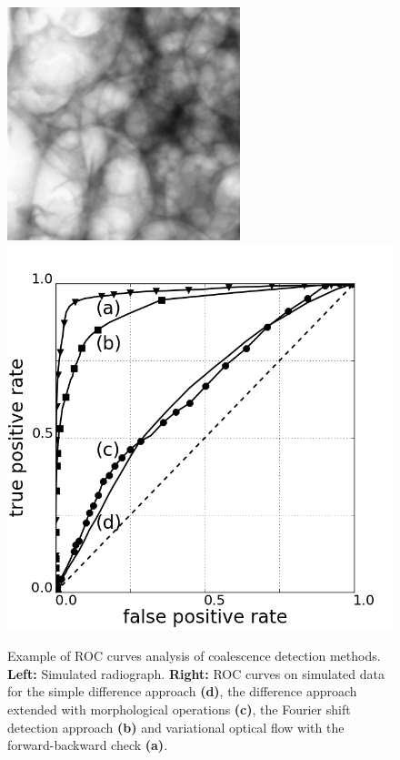 \begin{figure}[ht]
  \centerline{
    \mbox{\includegraphics[scale=0.635]{figures/sim_foam.png}}
    \mbox{\vspace{15pt} \includegraphics[scale=0.26]{figures/image_roc_all_methods_v3.png}}
  }
  \caption[]{Example of ROC curves analysis of coalescence detection methods. \textbf{Left:} Simulated radiograph. \textbf{Right:} ROC curves on simulated data for the simple difference approach \textbf{(d)}, the difference approach extended with morphological
operations \textbf{(c)}, the Fourier shift detection approach \textbf{(b)} and variational
optical flow with the forward-backward check \textbf{(a)}.}
  \label{fig:foam_performance}
\end{figure} 

